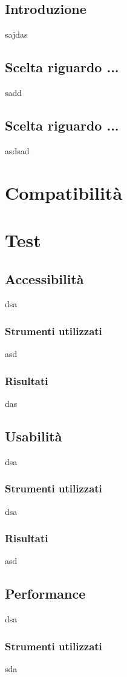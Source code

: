 \documentclass[12pt]{article}
\begin{document}
	\subsection{Introduzione}
	sajdas
	\subsection{Scelta riguardo ...}
	sadd
	\subsection{Scelta riguardo ...}
	asdsad
	
	\section{Compatibilità}
	
	\section{Test}
	\subsection{Accessibilità}
	dsa
	\subsubsection{Strumenti utilizzati}
	asd
	\subsubsection{Risultati}
	das
	
	\subsection{Usabilità}
	dsa
	\subsubsection{Strumenti utilizzati}
	dsa
	\subsubsection{Risultati}
	asd
	
	\subsection{Performance}
	dsa
	\subsubsection{Strumenti utilizzati}
	sda
\end{document}
